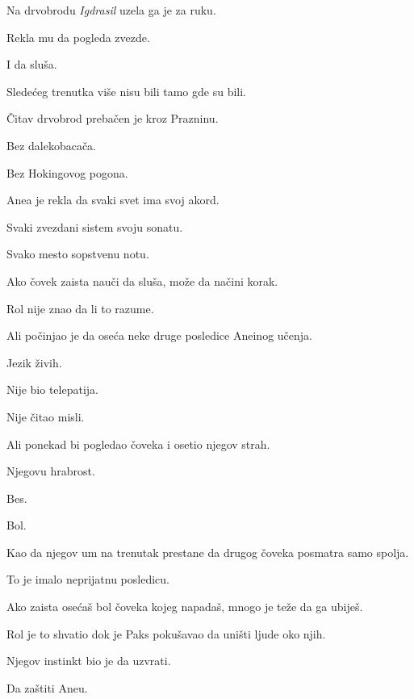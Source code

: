 Na drvobrodu \emph{Igdrasil} uzela ga je za ruku.

Rekla mu da pogleda zvezde.

I da sluša.

\bigskip

Sledećeg trenutka više nisu bili tamo gde su bili.

\bigskip

Čitav drvobrod prebačen je kroz Prazninu.

Bez dalekobacača.

Bez Hokingovog pogona.

\bigskip

Anea je rekla da svaki svet ima svoj akord.

Svaki zvezdani sistem svoju sonatu.

Svako mesto sopstvenu notu.

\bigskip

Ako čovek zaista nauči da sluša, može da načini korak.

\bigskip

Rol nije znao da li to razume.

Ali počinjao je da oseća neke druge posledice Aneinog učenja.

\bigskip

Jezik živih.

\bigskip

Nije bio telepatija.

Nije čitao misli.

\bigskip

Ali ponekad bi pogledao čoveka i osetio njegov strah.

Njegovu hrabrost.

Bes.

Bol.

\bigskip

Kao da njegov um na trenutak prestane da drugog čoveka posmatra samo spolja.

\bigskip

To je imalo neprijatnu posledicu.

\bigskip

Ako zaista osećaš bol čoveka kojeg napadaš, mnogo je teže da ga ubiješ.

\bigskip

Rol je to shvatio dok je Paks pokušavao da uništi ljude oko njih.

\bigskip

Njegov instinkt bio je da uzvrati.

Da zaštiti Aneu.

